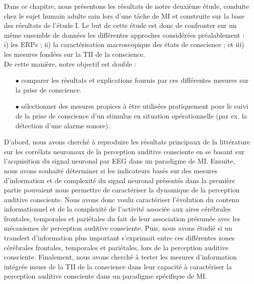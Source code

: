 Dans ce chapitre, nous présentons les résultats de notre deuxième étude, conduite chez le sujet humain adulte sain lors d'une tâche de MI et construite sur la base des résultats de l'étude I.
Le but de cette étude est donc de confronter sur un même ensemble de données les différentes approches considérées préalablement : i) les ERPs ; ii) la caractérisation macroscopique des états de conscience ; et iii) les mesures fondées sur la TII de la conscience. \\

De cette manière, notre objectif est double : 
\begin{itemize}
\item[$\bullet$] comparer les résultats et explications fournis par ces différentes mesures sur la prise de conscience.
\item[$\bullet$] sélectionner des mesures propices à être utilisées pratiquement pour le suivi de la prise de conscience d'un stimulus en situation opérationnelle (par ex. la détection d'une alarme sonore). \\
\end{itemize} 

D'abord, nous avons cherché à reproduire les résultats principaux de la littérature sur les corrélats neuronaux de la perception auditive consciente \citep{dykstra2016neural, giani2015detecting, gutschalk2008neural, wiegand2012correlates} en se basant sur l'acquisition du signal neuronal par EEG dans un paradigme de MI. 
Ensuite, nous avons souhaité déterminer si les indicateurs basés sur des mesures d'information et de complexité du signal neuronal présentés dans la première partie pouvaient nous permettre de caractériser la dynamique de la perception auditive consciente. 
Nous avons donc voulu caractériser l'évolution du contenu informationnel et de la complexité de l'activité associée aux aires cérébrales frontales, temporales et pariétales du fait de leur association présumée avec les mécanismes de perception auditive consciente. 
Puis, nous avons étudié si un transfert d'information plus important s'exprimait entre ces différentes zones cérébrales frontales, temporales et pariétales, lors de la perception auditive consciente. 
Finalement, nous avons cherché à tester les mesures d’information intégrée issues de la TII de la conscience dans leur capacité à caractériser la perception auditive consciente dans un paradigme spécifique de MI. \\

